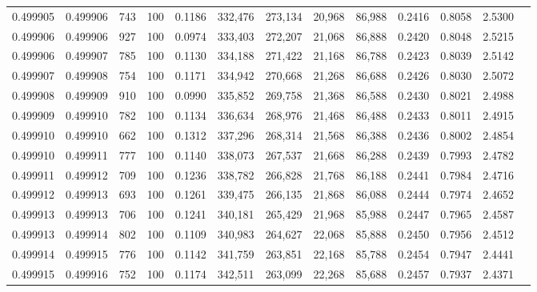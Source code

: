 \begin{tabular}{rrrrrrrrrrrrr}
0.499905 & 0.499906 &   743 & 100 &                                     0.1186 & 332,476 & 273,134 &  20,968 &  86,988 & 0.2416 & 0.8058 & 2.5300 \\
0.499906 & 0.499906 &   927 & 100 &                                     0.0974 & 333,403 & 272,207 &  21,068 &  86,888 & 0.2420 & 0.8048 & 2.5215 \\
0.499906 & 0.499907 &   785 & 100 &                                     0.1130 & 334,188 & 271,422 &  21,168 &  86,788 & 0.2423 & 0.8039 & 2.5142 \\
0.499907 & 0.499908 &   754 & 100 &                                     0.1171 & 334,942 & 270,668 &  21,268 &  86,688 & 0.2426 & 0.8030 & 2.5072 \\
0.499908 & 0.499909 &   910 & 100 &                                     0.0990 & 335,852 & 269,758 &  21,368 &  86,588 & 0.2430 & 0.8021 & 2.4988 \\
0.499909 & 0.499910 &   782 & 100 &                                     0.1134 & 336,634 & 268,976 &  21,468 &  86,488 & 0.2433 & 0.8011 & 2.4915 \\
0.499910 & 0.499910 &   662 & 100 &                                     0.1312 & 337,296 & 268,314 &  21,568 &  86,388 & 0.2436 & 0.8002 & 2.4854 \\
0.499910 & 0.499911 &   777 & 100 &                                     0.1140 & 338,073 & 267,537 &  21,668 &  86,288 & 0.2439 & 0.7993 & 2.4782 \\
0.499911 & 0.499912 &   709 & 100 &                                     0.1236 & 338,782 & 266,828 &  21,768 &  86,188 & 0.2441 & 0.7984 & 2.4716 \\
0.499912 & 0.499913 &   693 & 100 &                                     0.1261 & 339,475 & 266,135 &  21,868 &  86,088 & 0.2444 & 0.7974 & 2.4652 \\
0.499913 & 0.499913 &   706 & 100 &                                     0.1241 & 340,181 & 265,429 &  21,968 &  85,988 & 0.2447 & 0.7965 & 2.4587 \\
0.499913 & 0.499914 &   802 & 100 &                                     0.1109 & 340,983 & 264,627 &  22,068 &  85,888 & 0.2450 & 0.7956 & 2.4512 \\
0.499914 & 0.499915 &   776 & 100 &                                     0.1142 & 341,759 & 263,851 &  22,168 &  85,788 & 0.2454 & 0.7947 & 2.4441 \\
0.499915 & 0.499916 &   752 & 100 &                                     0.1174 & 342,511 & 263,099 &  22,268 &  85,688 & 0.2457 & 0.7937 & 2.4371 \\

\end{tabular}
